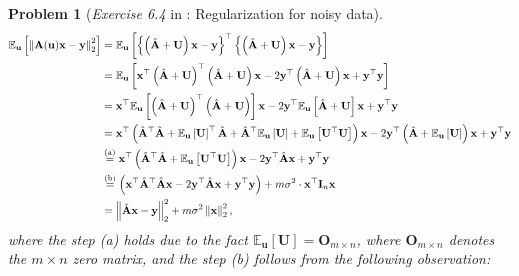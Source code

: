 \documentclass[11pt]{article}
\newtheorem{problem}{Problem}
\numberwithin{equation}{problem}
\begin{document}
\begin{problem} [\emph{Exercise 6.4} in \cite{calafiore2014optimization}: Regularization for noisy data]
{\begin{equation*}
    \begin{split}
        \mathbb{E}_{\mathbf{u}} \left[ \left\| \mathbf{A} (\mathbf{u}) \mathbf{x} - \mathbf{y} \right\|_{2}^2 \right]
        &= \mathbb{E}_{\mathbf{u}} \left[ \left\{ \left( \hat{\mathbf{A}} + \mathbf{U} \right) \mathbf{x} - \mathbf{y} \right\}^{\top} \left\{ \left( \hat{\mathbf{A}} + \mathbf{U} \right) \mathbf{x} - \mathbf{y} \right\} \right] \\
        &= \mathbb{E}_{\mathbf{u}} \left[ \mathbf{x}^{\top} \left( \hat{\mathbf{A}} + \mathbf{U} \right)^{\top} \left( \hat{\mathbf{A}} + \mathbf{U} \right) \mathbf{x} - 2 \mathbf{y}^{\top} \left( \hat{\mathbf{A}} + \mathbf{U} \right) \mathbf{x} + \mathbf{y}^{\top} \mathbf{y} \right] \\
        &= \mathbf{x}^{\top} \mathbb{E}_{\mathbf{u}} \left[ \left( \hat{\mathbf{A}} + \mathbf{U} \right)^{\top} \left( \hat{\mathbf{A}} + \mathbf{U} \right) \right] \mathbf{x} - 2 \mathbf{y}^{\top} \mathbb{E}_{\mathbf{u}} \left[ \hat{\mathbf{A}} + \mathbf{U} \right] \mathbf{x} + \mathbf{y}^{\top} \mathbf{y} \\
        &= \mathbf{x}^{\top} \left( \hat{\mathbf{A}}^{\top} \hat{\mathbf{A}} + \mathbb{E}_{\mathbf{u}} \left[ \mathbf{U} \right]^{\top} \hat{\mathbf{A}} + \hat{\mathbf{A}}^{\top} \mathbb{E}_{\mathbf{u}} \left[ \mathbf{U} \right] + \mathbb{E}_{\mathbf{u}} \left[ \mathbf{U}^{\top} \mathbf{U} \right] \right) \mathbf{x} - 2 \mathbf{y}^{\top} \left( \hat{\mathbf{A}} + \mathbb{E}_{\mathbf{u}} \left[ \mathbf{U} \right] \right) \mathbf{x} + \mathbf{y}^{\top} \mathbf{y} \\
        &\stackrel{\textnormal{(a)}}{=} \mathbf{x}^{\top} \left( \hat{\mathbf{A}}^{\top} \hat{\mathbf{A}} + \mathbb{E}_{\mathbf{u}} \left[ \mathbf{U}^{\top} \mathbf{U} \right] \right) \mathbf{x} - 2 \mathbf{y}^{\top} \hat{\mathbf{A}} \mathbf{x} + \mathbf{y}^{\top} \mathbf{y} \\
        &\stackrel{\textnormal{(b)}}{=} \left( \mathbf{x}^{\top}  \hat{\mathbf{A}}^{\top} \hat{\mathbf{A}} \mathbf{x} - 2 \mathbf{y}^{\top} \hat{\mathbf{A}} \mathbf{x} + \mathbf{y}^{\top} \mathbf{y} \right) + m \sigma^2 \cdot \mathbf{x}^{\top} \mathbf{I}_n \mathbf{x} \\
        &= \left\| \hat{\mathbf{A}} \mathbf{x} - \mathbf{y} \right\|_{2}^2 + m \sigma^2 \left\| \mathbf{x} \right\|_{2}^2,
    \end{split}
\end{equation*}
where the step (a) holds due to the fact $\mathbb{E}_{\mathbf{u}} \left[ \mathbf{U} \right] = \mathbf{O}_{m \times n}$, where $\mathbf{O}_{m \times n}$ denotes the $m \times n$ zero matrix, and the step (b) follows from the following observation:
}
\end{problem}
\end{document}
